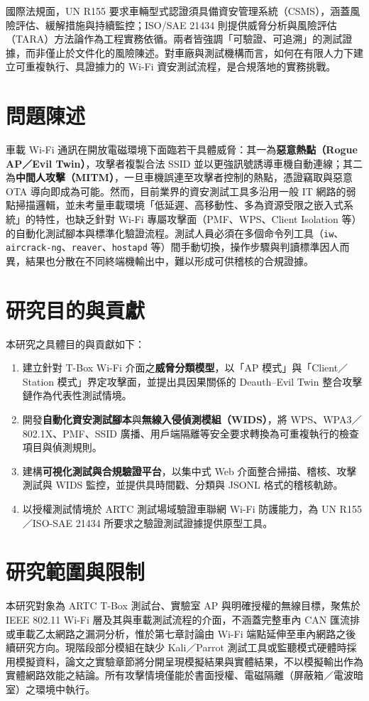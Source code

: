 \documentclass[12pt,a4paper,oneside]{report}
\begin{document}
國際法規面，UN R155 要求車輛型式認證須具備資安管理系統（CSMS），涵蓋風險評估、緩解措施與持續監控\cite{unr155}；ISO/SAE 21434 則提供威脅分析與風險評估（TARA）方法論作為工程實務依循\cite{iso21434}。兩者皆強調「可驗證、可追溯」的測試證據，而非僅止於文件化的風險陳述。對車廠與測試機構而言，如何在有限人力下建立可重複執行、具證據力的 Wi-Fi 資安測試流程，是合規落地的實務挑戰。

\section{問題陳述}
車載 Wi-Fi 通訊在開放電磁環境下面臨若干具體威脅：其一為\textbf{惡意熱點（Rogue AP／Evil Twin）}，攻擊者複製合法 SSID 並以更強訊號誘導車機自動連線；其二為\textbf{中間人攻擊（MITM）}，一旦車機誤連至攻擊者控制的熱點，憑證竊取與惡意 OTA 導向即成為可能。然而，目前業界的資安測試工具多沿用一般 IT 網路的弱點掃描邏輯，並未考量車載環境「低延遲、高移動性、多為資源受限之嵌入式系統」的特性，也缺乏針對 Wi-Fi 專屬攻擊面（PMF、WPS、Client Isolation 等）的自動化測試腳本與標準化驗證流程。測試人員必須在多個命令列工具（\texttt{iw}、\texttt{aircrack-ng}、\texttt{reaver}、\texttt{hostapd} 等）間手動切換，操作步驟與判讀標準因人而異，結果也分散在不同終端機輸出中，難以形成可供稽核的合規證據。

\section{研究目的與貢獻}
本研究之具體目的與貢獻如下：
\begin{enumerate}
  \item 建立針對 T-Box Wi-Fi 介面之\textbf{威脅分類模型}，以「AP 模式」與「Client／Station 模式」界定攻擊面，並提出具因果關係的 Deauth–Evil Twin 整合攻擊鏈作為代表性測試情境。
  \item 開發\textbf{自動化資安測試腳本}與\textbf{無線入侵偵測模組（WIDS）}，將 WPS、WPA3／802.1X、PMF、SSID 廣播、用戶端隔離等安全要求轉換為可重複執行的檢查項目與偵測規則。
  \item 建構\textbf{可視化測試與合規驗證平台}，以集中式 Web 介面整合掃描、稽核、攻擊測試與 WIDS 監控，並提供具時間戳、分類與 JSONL 格式的稽核軌跡。
  \item 以授權測試情境於 ARTC 測試場域驗證車聯網 Wi-Fi 防護能力，為 UN R155／ISO-SAE 21434 所要求之驗證測試證據提供原型工具。
\end{enumerate}

\section{研究範圍與限制}
本研究對象為 ARTC T-Box 測試台、實驗室 AP 與明確授權的無線目標，聚焦於 IEEE 802.11 Wi-Fi 層及其與車載測試流程的介面，不涵蓋完整車內 CAN 匯流排或車載乙太網路之漏洞分析，惟於第七章討論由 Wi-Fi 端點延伸至車內網路之後續研究方向。現階段部分模組在缺少 Kali／Parrot 測試工具或監聽模式硬體時採用模擬資料，論文之實驗章節將分開呈現模擬結果與實體結果，不以模擬輸出作為實體網路效能之結論。所有攻擊情境僅能於書面授權、電磁隔離（屏蔽箱／電波暗室）之環境中執行。
\end{document}
